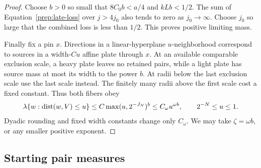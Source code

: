 \begin{proof}
Choose $b>0$ so small that $8C_0b<a/4$ and $kLb<1/2$.
The sum of Equation~\eqref{prep:late-loss} over $j>4j_0$ also
tends to zero as $j_0\to\infty$. Choose $j_0$ so large that the
combined loss is less than $1/2$. This proves positive limiting mass.

Finally fix a pin $x$. Directions in a linear-hyperplane
$u$-neighborhood correspond to sources in a width-$Cu$ affine
plate through $x$. At an available comparable exclusion scale,
a heavy plate leaves no retained pairs, while a light plate has
source mass at most its width to the power $b$. At radii below the
last exclusion scale use the last scale instead. The finitely many
radii above the first scale cost a fixed constant. Thus both fibers
obey
\[
 \lambda\{w:\operatorname{dist}(w,V)\le u\}
 \le C\max(u,2^{-J_N})^b
 \le C_\omega u^{\omega b},
 \qquad 2^{-N}\le u\le1.
\]
Dyadic rounding and fixed width constants change only $C_\omega$.
We may take $\zeta=\omega b$, or any smaller positive exponent.
\end{proof}

\subsection{Starting pair measures}

